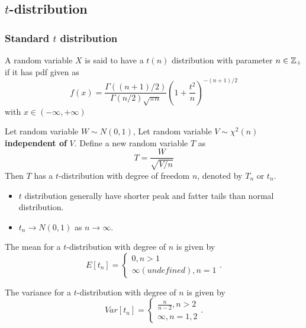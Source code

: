 \begin{refsection}
\subsection{ $t$-distribution}\label{ch:theory-of-statistics:sec:studentTdistribution}
\subsubsection{Standard $t$ distribution}
\begin{definition}[t distribution]\cite[192]{hoggintroduction}
	A random variable $X$ is said to have a $t(n)$ distribution with parameter $n\in \mathbb{Z}_+$ if it has pdf given as
	$$f(x) = \frac{\Gamma((n+1)/2)}{\Gamma(n/2)\sqrt{\pi n}} (1 + \frac{t^2}{n})^{-(n+1)/2}$$
	with $x\in (-\infty,+\infty)$	
\end{definition}




\begin{definition}[alternative]\label{ch:theory-of-statistics:def:tdistribution}
Let random variable $W \sim N(0,1)$, Let random variable $V\sim \chi^2(n)$ \textbf{independent of} $V$. Define a new random variable $T$ as 
$$T=\frac{W}{\sqrt{V/n}}$$
Then $T$ has a $t$-distribution with degree of freedom $n$, denoted by $T_n$ or $t_n$.	
\end{definition}


\begin{remark}\hfill
	\begin{itemize}
		\item $t$ distribution generally have shorter peak and fatter tails than normal distribution.
		\item $t_n \to N(0,1)$ as $n\to \infty$.
	\end{itemize}
\end{remark}

\begin{lemma}
The mean for a $t$-distribution with degree of $n$ is given by
$$E[t_n] = \begin{cases}
0, n > 1 \\
\infty (undefined), n=1
\end{cases}.$$ 

The variance for a $t$-distribution with degree of $n$ is given by
$$Var[t_n] = \begin{cases}
\frac{n}{n-2}, n > 2 \\
\infty, n=1,2
\end{cases}.$$ 
\end{lemma}


\end{refsection}
